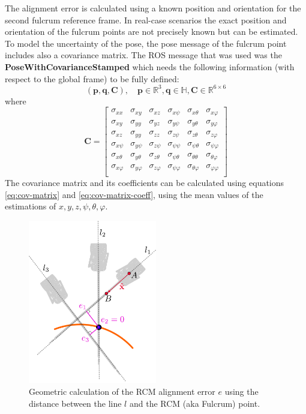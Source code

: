 The alignment error is calculated using a known position and orientation for the second fulcrum reference frame. In real-case scenarios the exact position and orientation of the fulcrum points are not precisely known 
but can be estimated. To model the uncertainty of the pose, the pose message of the fulcrum point includes also a covariance matrix. The ROS message that was used was the \textbf{PoseWithCovarianceStamped} which needs the 
following information (with respect to the global frame) to be fully defined:
\[
( \mathbf{p}, \mathbf{q}, \mathbf{C} ), \quad \mathbf{p} \in \mathbb{R}^3, \mathbf{q} \in \mathbb{H}, \mathbf{C} \in \mathbb{R}^{6 \times 6}
\]
where 
\begin{equation}
\mathbf{C} = \begin{bmatrix}
σ_{xx} & σ_{xy} & σ_{xz} & σ_{xψ} & σ_{xθ} & σ_{xφ} \\
σ_{xy} & σ_{yy} & σ_{yz} & σ_{yψ} & σ_{yθ} & σ_{yφ} \\
σ_{xz} & σ_{yy} & σ_{zz} & σ_{zψ} & σ_{zθ} & σ_{zφ} \\
σ_{xψ} & σ_{yψ} & σ_{zψ} & σ_{ψψ} & σ_{ψθ} & σ_{ψφ} \\
σ_{xθ} & σ_{yθ} & σ_{zθ} & σ_{ψθ} & σ_{θθ} & σ_{θφ} \\
σ_{xφ} & σ_{yφ} & σ_{zφ} & σ_{ψφ} & σ_{θφ} & σ_{φφ} \\
\end{bmatrix}
\end{equation}
The covariance matrix and its coefficients can be calculated using equations \ref{eq:cov-matrix} and \ref{eq:cov-matrix-coeff}, using the mean values of the estimations of $x,y,z,ψ,θ,φ$.

\begin{center}
\begin{figure}[!htb]
\centering
\includegraphics[width=0.5\textwidth]{images/robot_planner6/rcm-error-geometry.png}
\caption{Geometric calculation of the RCM alignment error $e$ using the distance between the line $l$ and the RCM (aka Fulcrum) point.}
\label{rcm-error-geometry}
\end{figure}
\end{center}


